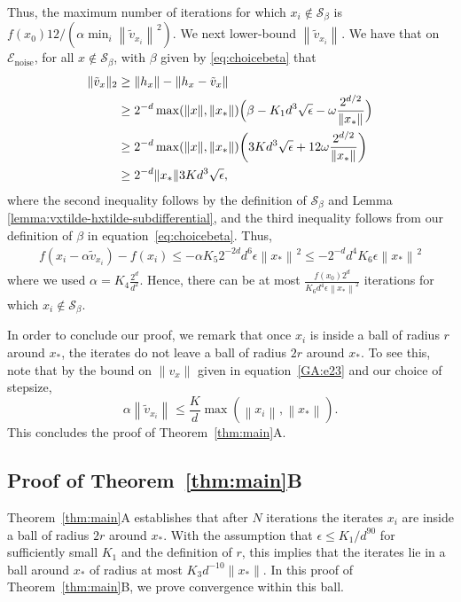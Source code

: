 \documentclass[11pt]{article}
\newcommand{\eps}{\epsilon}
\newcommand{\xo}{x_\ast}
\newcommand{\vbar}{\overline{v}}
\newcommand{\Tnorm}{}
\newcommand\norm[2][\Tnorm]{\ensuremath{{\left\|#2\right\|}_{#1}}}
\newcommand\setS{\mathcal S}
\newcommand\qbarx{\bar q_x}
\newcommand\eventnoisesmall{\mathcal E_{\text{noise}}}
\newcommand\stepdir[1]{\tilde v_{#1}}
\begin{document}
Thus, the maximum number of iterations for which $x_i \not\in \setS_\beta$ is $f(x_0) 12 / (\alpha \min_i  \norm{\stepdir{x_i}}^2)$.
We next lower-bound $\norm{\stepdir{x_i}}$.
We have that on $\eventnoisesmall$, for all $x \not\in \setS_\beta$, with $\beta$ given by \eqref{eq:choicebeta} that
\begin{align}
\|\stepdir{x} \|_2&\geq \|h_x\| - \| h_x - \stepdir{x}\| \notag \\
&\geq  2^{-d} \max(\|x\|, \|x_*\|) \Bigl( \beta - K_1 d^3 \sqrt{\eps} - \omega\frac{2^{d/2}}{\norm{x_*}}   \Bigr)   \notag\\
%
&\geq 2^{-d} \max(\|x\|, \|x_*\|) \biggl(3K d^3 \sqrt{\eps} + 12 \omega\frac{2^{d/2}}{\norm{x_*}} \biggr) \label{lowerbound-vxtilde-with-noise} \\
%
&\geq 2^{-d} \|x_*\| 3K d^3 \sqrt{\eps}, \notag
\end{align}
where the second inequality follows by the definition of $\setS_\beta$ and Lemma \ref{lemma:vxtilde-hxtilde-subdifferential}, and the third inequality follows from our definition of $\beta$ in equation~\eqref{eq:choicebeta}.
Thus,
\begin{align*}
f(x_{i} - \alpha \stepdir{x_i}) - f(x_{i})
\leq
- \alpha K_5 2^{-2d}d^6 \epsilon \norm{\xo}^2
\leq
-2^{-d} d^4 K_6 \epsilon \norm{\xo}^2
\end{align*}
where we used
$\alpha = K_4\frac{2^d}{d^2}$.
Hence, there can be at most $\frac{f(x_0) 2^d}{K_6 d^4 \epsilon \norm{\xo}^2}$ iterations for which $x_i \not \in \setS_\beta$.

In order to conclude our proof, we remark that once $x_i$ is inside a ball of radius $r$ around $\xo$, the iterates do not leave a ball of radius $2r$ around $\xo$.
To see this, note that by the bound on $\|v_x\|$ given in equation~\eqref{GA:e23} and our choice of stepsize,
\[
\alpha \norm{\stepdir{x_i}}
\leq
\frac{K}{d} \max(\norm{x_i}, \norm{\xo}).
\]
This concludes the proof of Theorem~\ref{thm:main}A. %


\subsection{Proof of Theorem~\ref{thm:main}B}

Theorem~\ref{thm:main}A establishes that after $N$ iterations the iterates $x_i$ are inside a ball of radius $2r$ around $\xo$. With the assumption that $\epsilon \leq K_1 / d^{90}$ for sufficiently small $K_1$ and the definition of $r$, this implies that the iterates lie in a ball around $\xo$ of radius at most $K_3 d^{-10} \|x_*\|$. 
In this proof of Theorem~\ref{thm:main}B, we prove convergence within this ball.
\end{document}
